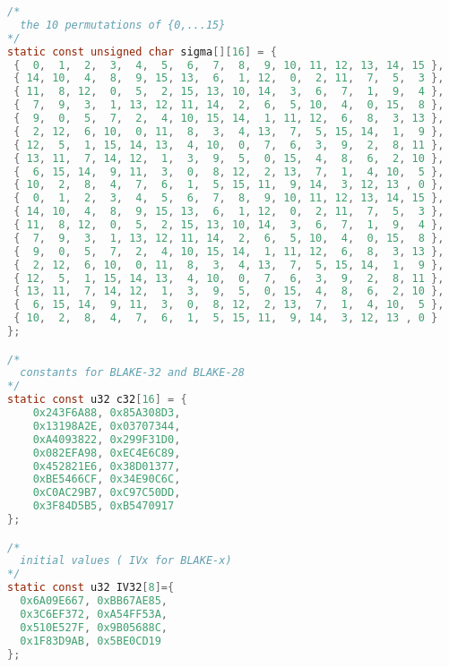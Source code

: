 \documentclass{acmtrans2m}
\begin{document}
\begin{lstlisting}[language=C,caption={Declaration of permutation, constants and initial values of BLAKE-32},label=listing:c1]
/*
  the 10 permutations of {0,...15}
*/
static const unsigned char sigma[][16] = {
 {  0,  1,  2,  3,  4,  5,  6,  7,  8,  9, 10, 11, 12, 13, 14, 15 },
 { 14, 10,  4,  8,  9, 15, 13,  6,  1, 12,  0,  2, 11,  7,  5,  3 },
 { 11,  8, 12,  0,  5,  2, 15, 13, 10, 14,  3,  6,  7,  1,  9,  4 },
 {  7,  9,  3,  1, 13, 12, 11, 14,  2,  6,  5, 10,  4,  0, 15,  8 },
 {  9,  0,  5,  7,  2,  4, 10, 15, 14,  1, 11, 12,  6,  8,  3, 13 },
 {  2, 12,  6, 10,  0, 11,  8,  3,  4, 13,  7,  5, 15, 14,  1,  9 },
 { 12,  5,  1, 15, 14, 13,  4, 10,  0,  7,  6,  3,  9,  2,  8, 11 },
 { 13, 11,  7, 14, 12,  1,  3,  9,  5,  0, 15,  4,  8,  6,  2, 10 },
 {  6, 15, 14,  9, 11,  3,  0,  8, 12,  2, 13,  7,  1,  4, 10,  5 },
 { 10,  2,  8,  4,  7,  6,  1,  5, 15, 11,  9, 14,  3, 12, 13 , 0 }, 
 {  0,  1,  2,  3,  4,  5,  6,  7,  8,  9, 10, 11, 12, 13, 14, 15 },
 { 14, 10,  4,  8,  9, 15, 13,  6,  1, 12,  0,  2, 11,  7,  5,  3 },
 { 11,  8, 12,  0,  5,  2, 15, 13, 10, 14,  3,  6,  7,  1,  9,  4 },
 {  7,  9,  3,  1, 13, 12, 11, 14,  2,  6,  5, 10,  4,  0, 15,  8 },
 {  9,  0,  5,  7,  2,  4, 10, 15, 14,  1, 11, 12,  6,  8,  3, 13 },
 {  2, 12,  6, 10,  0, 11,  8,  3,  4, 13,  7,  5, 15, 14,  1,  9 },
 { 12,  5,  1, 15, 14, 13,  4, 10,  0,  7,  6,  3,  9,  2,  8, 11 },
 { 13, 11,  7, 14, 12,  1,  3,  9,  5,  0, 15,  4,  8,  6,  2, 10 },
 {  6, 15, 14,  9, 11,  3,  0,  8, 12,  2, 13,  7,  1,  4, 10,  5 },
 { 10,  2,  8,  4,  7,  6,  1,  5, 15, 11,  9, 14,  3, 12, 13 , 0 }
};

/*
  constants for BLAKE-32 and BLAKE-28
*/
static const u32 c32[16] = {
    0x243F6A88, 0x85A308D3,
    0x13198A2E, 0x03707344,
    0xA4093822, 0x299F31D0,
    0x082EFA98, 0xEC4E6C89,
    0x452821E6, 0x38D01377,
    0xBE5466CF, 0x34E90C6C,
    0xC0AC29B7, 0xC97C50DD,
    0x3F84D5B5, 0xB5470917 
};

/*
  initial values ( IVx for BLAKE-x)
*/
static const u32 IV32[8]={
  0x6A09E667, 0xBB67AE85,
  0x3C6EF372, 0xA54FF53A,
  0x510E527F, 0x9B05688C,
  0x1F83D9AB, 0x5BE0CD19
};
\end{lstlisting}
\end{document}
